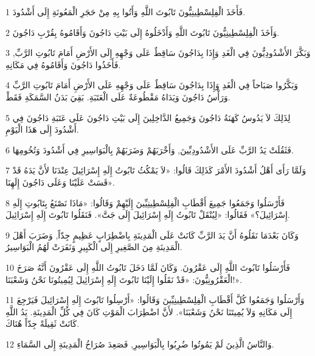 \par 1 فَأَخَذَ الْفِلِسْطِينِيُّونَ تَابُوتَ اللَّهِ وَأَتُوا بِهِ مِنْ حَجَرِ الْمَعُونَةِ إِلَى أَشْدُودَ.
\par 2 وَأَخَذَ الْفِلِسْطِينِيُّونَ تَابُوتَ اللَّهِ وَأَدْخَلُوهُ إِلَى بَيْتِ دَاجُونَ وَأَقَامُوهُ بِقُرْبِ دَاجُونَ.
\par 3 وَبَكَّرَ الأَشْدُودِيُّونَ فِي الْغَدِ وَإِذَا بِدَاجُونَ سَاقِطٌ عَلَى وَجْهِهِ إِلَى الأَرْضِ أَمَامَ تَابُوتِ الرَّبِّ, فَأَخَذُوا دَاجُونَ وَأَقَامُوهُ فِي مَكَانِهِ.
\par 4 وَبَكَّرُوا صَبَاحاً فِي الْغَدِ وَإِذَا بِدَاجُونَ سَاقِطٌ عَلَى وَجْهِهِ عَلَى الأَرْضِ أَمَامَ تَابُوتِ الرَّبِّ وَرَأْسُ دَاجُونَ وَيَدَاهُ مَقْطُوعَةٌ عَلَى الْعَتَبَةِ. بَقِيَ بَدَنُ السَّمَكَةِ فَقَطْ.
\par 5 لِذَلِكَ لاَ يَدُوسُ كَهَنَةُ دَاجُونَ وَجَمِيعُ الدَّاخِلِينَ إِلَى بَيْتِ دَاجُونَ عَلَى عَتَبَةِ دَاجُونَ فِي أَشْدُودَ إِلَى هَذَا الْيَوْمِ.
\par 6 فَثَقُلَتْ يَدُ الرَّبِّ عَلَى الأَشْدُودِيِّينَ, وَأَخْرَبَهُمْ وَضَرَبَهُمْ بِالْبَوَاسِيرِ فِي أَشْدُودَ وَتُخُومِهَا.
\par 7 وَلَمَّا رَأَى أَهْلُ أَشْدُودَ الأَمْرَ كَذَلِكَ قَالُوا: «لاَ يَمْكُثُ تَابُوتُ إِلَهِ إِسْرَائِيلَ عِنْدَنَا لأَنَّ يَدَهُ قَدْ قَسَتْ عَلَيْنَا وَعَلَى دَاجُونَ إِلَهِنَا».
\par 8 فَأَرْسَلُوا وَجَمَعُوا جَمِيعَ أَقْطَابِ الْفِلِسْطِينِيِّينَ إِلَيْهِمْ وَقَالُوا: «مَاذَا نَصْنَعُ بِتَابُوتِ إِلَهِ إِسْرَائِيلَ؟» فَقَالُوا: «لِيُنْقَلْ تَابُوتُ إِلَهِ إِسْرَائِيلَ إِلَى جَتَّ». فَنَقَلُوا تَابُوتَ إِلَهِ إِسْرَائِيلَ.
\par 9 وَكَانَ بَعْدَمَا نَقَلُوهُ أَنَّ يَدَ الرَّبِّ كَانَتْ عَلَى الْمَدِينَةِ بِاضْطِرَابٍ عَظِيمٍ جِدّاً, وَضَرَبَ أَهْلَ الْمَدِينَةِ مِنَ الصَّغِيرِ إِلَى الْكَبِيرِ وَنَفَرَتْ لَهُمُ الْبَوَاسِيرُ.
\par 10 فَأَرْسَلُوا تَابُوتَ اللَّهِ إِلَى عَقْرُونَ. وَكَانَ لَمَّا دَخَلَ تَابُوتُ اللَّهِ إِلَى عَقْرُونَ أَنَّهُ صَرَخَ الْعَقْرُونِيُّونَ: «قَدْ نَقَلُوا إِلَيْنَا تَابُوتَ إِلَهِ إِسْرَائِيلَ لِيُمِيتُونَا نَحْنُ وَشَعْبَنَا!».
\par 11 وَأَرْسَلُوا وَجَمَعُوا كُلَّ أَقْطَابِ الْفِلِسْطِينِيِّينَ وَقَالُوا: «أَرْسِلُوا تَابُوتَ إِلَهِ إِسْرَائِيلَ فَيَرْجِعَ إِلَى مَكَانِهِ وَلاَ يُمِيتَنَا نَحْنُ وَشَعْبَنَا». لأَنَّ اضْطِرَابَ الْمَوْتِ كَانَ فِي كُلِّ الْمَدِينَةِ. يَدُ اللَّهِ كَانَتْ ثَقِيلَةً جِدّاً هُنَاكَ.
\par 12 وَالنَّاسُ الَّذِينَ لَمْ يَمُوتُوا ضُرِبُوا بِالْبَوَاسِيرِ, فَصَعِدَ صُرَاخُ الْمَدِينَةِ إِلَى السَّمَاءِ.

